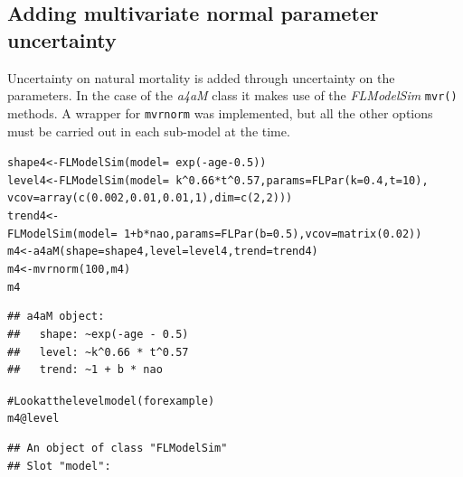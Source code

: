 \documentclass[a4paper,english,10pt]{article}\usepackage[]{graphicx}\usepackage[]{color}
\makeatletter
\newcommand{\hlnum}[1]{\textcolor[rgb]{0.2,0.2,0.2}{#1}}%
\newcommand{\hlcom}[1]{\textcolor[rgb]{0.2,0.267,0.4}{#1}}%
\newcommand{\hlopt}[1]{\textcolor[rgb]{0.2,0.2,0.2}{#1}}%
\newcommand{\hlstd}[1]{\textcolor[rgb]{0,0,0}{#1}}%
\newcommand{\hlkwb}[1]{\textcolor[rgb]{0.361,0.506,0.596}{#1}}%
\newcommand{\hlkwc}[1]{\textcolor[rgb]{0.361,0.506,0.596}{#1}}%
\newcommand{\hlkwd}[1]{\textcolor[rgb]{0.361,0.506,0.596}{#1}}%
\newenvironment{kframe}{%
 \def\at@end@of@kframe{}%
 \ifinner\ifhmode%
  \def\at@end@of@kframe{\end{minipage}}%
  \begin{minipage}{\columnwidth}%
 \fi\fi%
 \def\FrameCommand##1{\hskip\@totalleftmargin \hskip-\fboxsep
 \colorbox{shadecolor}{##1}\hskip-\fboxsep
     \hskip-\linewidth \hskip-\@totalleftmargin \hskip\columnwidth}%
 \MakeFramed {\advance\hsize-\width
   \@totalleftmargin\z@ \linewidth\hsize
   \@setminipage}}%
 {\par\unskip\endMakeFramed%
 \at@end@of@kframe}
\newenvironment{knitrout}{}{} %
\newcommand{\code}[1]{{\texttt{#1}}}
\newcommand{\class}[1]{{\textit{#1}}}
\makeatother
\begin{document}
\subsection{Adding multivariate normal parameter uncertainty}

Uncertainty on natural mortality is added through uncertainty on the parameters. In the case of the \class{a4aM} class it makes use of the \class{FLModelSim} \code{mvr()} methods. A wrapper for \code{mvrnorm} was implemented, but all the other options must be carried out in each sub-model at the time.

\begin{knitrout}
\color{fgcolor}\begin{kframe}
\begin{alltt}
\hlstd{shape4} \hlkwb{<-} \hlkwd{FLModelSim}\hlstd{(}\hlkwc{model} \hlstd{=} \hlopt{~}\hlkwd{exp}\hlstd{(}\hlopt{-}\hlstd{age} \hlopt{-} \hlnum{0.5}\hlstd{))}
\hlstd{level4} \hlkwb{<-} \hlkwd{FLModelSim}\hlstd{(}\hlkwc{model} \hlstd{=} \hlopt{~}\hlstd{k}\hlopt{^}\hlnum{0.66} \hlopt{*} \hlstd{t}\hlopt{^}\hlnum{0.57}\hlstd{,} \hlkwc{params} \hlstd{=} \hlkwd{FLPar}\hlstd{(}\hlkwc{k} \hlstd{=} \hlnum{0.4}\hlstd{,} \hlkwc{t} \hlstd{=} \hlnum{10}\hlstd{),}
    \hlkwc{vcov} \hlstd{=} \hlkwd{array}\hlstd{(}\hlkwd{c}\hlstd{(}\hlnum{0.002}\hlstd{,} \hlnum{0.01}\hlstd{,} \hlnum{0.01}\hlstd{,} \hlnum{1}\hlstd{),} \hlkwc{dim} \hlstd{=} \hlkwd{c}\hlstd{(}\hlnum{2}\hlstd{,} \hlnum{2}\hlstd{)))}
\hlstd{trend4} \hlkwb{<-} \hlkwd{FLModelSim}\hlstd{(}\hlkwc{model} \hlstd{=} \hlopt{~}\hlnum{1} \hlopt{+} \hlstd{b} \hlopt{*} \hlstd{nao,} \hlkwc{params} \hlstd{=} \hlkwd{FLPar}\hlstd{(}\hlkwc{b} \hlstd{=} \hlnum{0.5}\hlstd{),} \hlkwc{vcov} \hlstd{=} \hlkwd{matrix}\hlstd{(}\hlnum{0.02}\hlstd{))}
\hlstd{m4} \hlkwb{<-} \hlkwd{a4aM}\hlstd{(}\hlkwc{shape} \hlstd{= shape4,} \hlkwc{level} \hlstd{= level4,} \hlkwc{trend} \hlstd{= trend4)}
\hlstd{m4} \hlkwb{<-} \hlkwd{mvrnorm}\hlstd{(}\hlnum{100}\hlstd{, m4)}
\hlstd{m4}
\end{alltt}
\begin{verbatim}
## a4aM object:
##   shape: ~exp(-age - 0.5)
##   level: ~k^0.66 * t^0.57
##   trend: ~1 + b * nao
\end{verbatim}
\begin{alltt}
\hlcom{# Look at the level model (for example)}
\hlstd{m4}\hlopt{@}\hlkwc{level}
\end{alltt}
\begin{verbatim}
## An object of class "FLModelSim"
## Slot "model":

\end{verbatim}
\end{kframe}
\end{knitrout}
\end{document}
